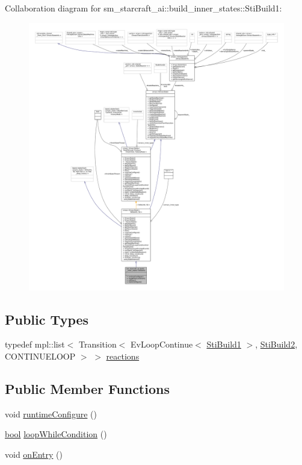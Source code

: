Collaboration diagram for sm\+\_\+starcraft\+\_\+ai\+:\+:build\+\_\+inner\+\_\+states\+:\+:Sti\+Build1\+:
\nopagebreak
\begin{figure}[H]
\begin{center}
\leavevmode
\includegraphics[width=350pt]{structsm__starcraft__ai_1_1build__inner__states_1_1StiBuild1__coll__graph}
\end{center}
\end{figure}
\subsection*{Public Types}
\begin{DoxyCompactItemize}
\item 
typedef mpl\+::list$<$ Transition$<$ Ev\+Loop\+Continue$<$ \hyperlink{structsm__starcraft__ai_1_1build__inner__states_1_1StiBuild1}{Sti\+Build1} $>$, \hyperlink{structsm__starcraft__ai_1_1build__inner__states_1_1StiBuild2}{Sti\+Build2}, C\+O\+N\+T\+I\+N\+U\+E\+L\+O\+OP $>$ $>$ \hyperlink{structsm__starcraft__ai_1_1build__inner__states_1_1StiBuild1_aabf9de8b9a975d7b8c3ac5ec150706a7}{reactions}
\end{DoxyCompactItemize}
\subsection*{Public Member Functions}
\begin{DoxyCompactItemize}
\item 
void \hyperlink{structsm__starcraft__ai_1_1build__inner__states_1_1StiBuild1_af9d35c64cffb6a3a117a00c6b77a8ab0}{runtime\+Configure} ()
\item 
\hyperlink{classbool}{bool} \hyperlink{structsm__starcraft__ai_1_1build__inner__states_1_1StiBuild1_a26ccf2930308213ae74751d6b2f5813a}{loop\+While\+Condition} ()
\item 
void \hyperlink{structsm__starcraft__ai_1_1build__inner__states_1_1StiBuild1_a699277580164547c939b525a17dc01ec}{on\+Entry} ()
\end{DoxyCompactItemize}

